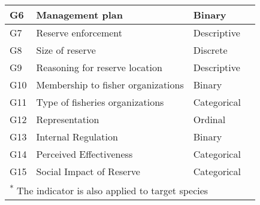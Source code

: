 \documentclass[12pt,]{article}
\providecommand{\DIFaddendFL}{} %
\DeclareRobustCommand{\DIFaddendFL}{\DIFOaddendFL \let\includegraphics\DIFOincludegraphics} %
\begin{document}
\begin{table}
{\begin{tabular}[t]{l|l|l|l}
\hline
\hspace{1em}G6 & Management plan & Binary & \\
\hline
\hspace{1em}G7 & Reserve enforcement & Descriptive & \\
\hline
\hspace{1em}G8 & Size of reserve & Discrete & \\
\hline
\hspace{1em}G9 & Reasoning for reserve location & Descriptive & \\
\hline
\hspace{1em}G10 & Membership to fisher organizations & Binary & \\
\hline
\hspace{1em}G11 & Type of fisheries organizations & Categorical & \\
\hline
\hspace{1em}G12 & Representation & Ordinal & \\
\hline
\hspace{1em}G13 & Internal Regulation & Binary & \\
\hline
\hspace{1em}G14 & Perceived Effectiveness & Categorical & \\
\hline
\hspace{1em}G15 & Social Impact of Reserve & Categorical & \\
\hline
\multicolumn{4}{l}{\textsuperscript{*} The indicator is also applied to target species}\\
\end{tabular}}
\DIFaddendFL \end{table}

\clearpage
\end{document}
